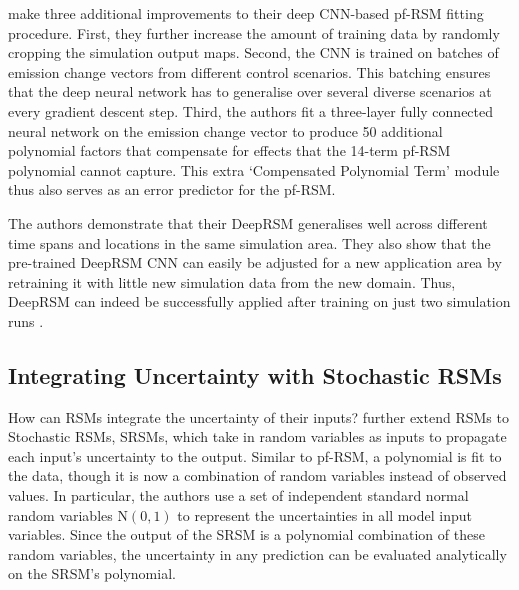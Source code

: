 \newpar \citeauthor{deep-rsm-2020} make three additional improvements to their deep CNN-based pf-RSM fitting procedure. First, they further increase the amount of training data by randomly cropping the simulation output maps. Second, the CNN is trained on batches of emission change vectors from different control scenarios. This batching ensures that the deep neural network has to generalise over several diverse scenarios at every gradient descent step. Third, the authors fit a three-layer fully connected neural network on the emission change vector to produce 50 additional polynomial factors that compensate for effects that the 14-term pf-RSM polynomial cannot capture. This extra `Compensated Polynomial Term' module thus also serves as an error predictor for the pf-RSM.

The authors demonstrate that their DeepRSM generalises well across different time spans and locations in the same simulation area. They also show that the pre-trained DeepRSM CNN can easily be adjusted for a new application area by retraining it with little new simulation data from the new domain. Thus, DeepRSM can indeed be successfully applied after training on just two simulation runs \cite{deep-rsm-2020}.

\subsection{Integrating Uncertainty with Stochastic RSMs} \label{txt:stochastic-rsm}

How can RSMs integrate the uncertainty of their inputs? \textcite{srsm-phd-1999} further extend RSMs to Stochastic RSMs, SRSMs, which take in random variables as inputs to propagate each input's uncertainty to the output. Similar to pf-RSM, a polynomial is fit to the data, though it is now a combination of random variables instead of observed values. In particular, the authors use a set of independent standard normal random variables $\text{N}(0, 1)$ to represent the uncertainties in all model input variables. Since the output of the SRSM is a polynomial combination of these random variables, the uncertainty in any prediction can be evaluated analytically on the SRSM's polynomial.

